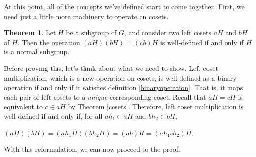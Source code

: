 \documentclass[12pt]{article}
\theoremstyle{definition}
\newtheorem{theorem}{Theorem}[section]
\theoremstyle{definition}
\theoremstyle{definition}
\theoremstyle{definition}
\begin{document}
At this point, all of the concepts we've defined start to come together. First, we need just a little more machinery to operate on cosets.

\begin{theorem}
Let $H$ be a subgroup of $G$, and consider two left cosets $aH$ and $bH$ of $H$. Then the operation $(aH)(bH) = (ab)H$ is well-defined if and only if $H$ is a normal subgroup.
\end{theorem}

Before proving this, let's think about what we need to show. Left coset multiplication, which is a new operation on cosets, is well-defined as a binary operation if and only if it satisfies definition \ref{binaryoperation}. That is, it maps each pair of left cosets to a \textit{unique} corresponding coset. Recall that $aH = cH$ is equivalent to $c \in aH$ by Theorem \ref{cosets}. Therefore, left coset multiplication is well-defined if and only if, for all $ah_1 \in aH$ and $bh_2 \in bH$,

\begin{center}
    $(aH)(bH) = (ah_1H)(bh_2H) = (ab)H = (ah_1bh_2)H$.
\end{center}

With this reformulation, we can now proceed to the proof.
\end{document}
